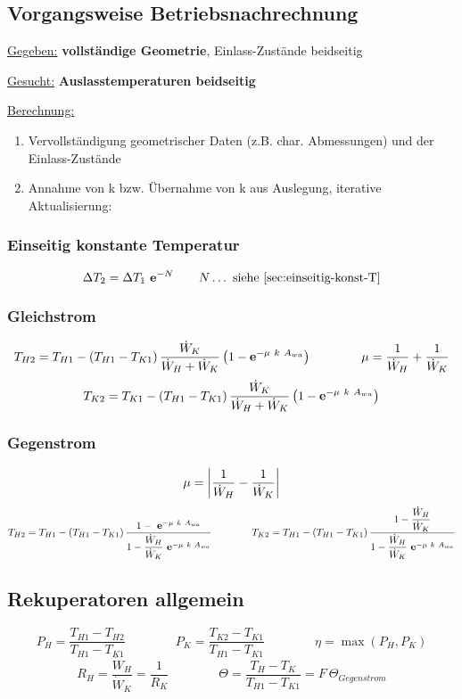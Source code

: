 \subsection{Vorgangsweise Betriebsnachrechnung}
	\underline{Gegeben:} \textbf{vollständige Geometrie}, Einlass-Zustände beidseitig

	\underline{Gesucht:} \textbf{Auslasstemperaturen beidseitig}

	\begin{singlespace}
		\underline{Berechnung: }
		\begin{enumerate}
			\item Vervollständigung geometrischer Daten (z.B. char. Abmessungen) und der Einlass-Zustände
			\item Annahme von k bzw. Übernahme von k aus Auslegung, iterative Aktualisierung:
		\end{enumerate}
	\end{singlespace}

\subsubsection{Einseitig konstante Temperatur }
	\[ \Delta T_2 = \Delta T_1\ \eul^{-N}   \qquad N\dots \text{ siehe \ref{sec:einseitig-konst-T}} \]

\subsubsection{Gleichstrom}
	\setlength{\abovedisplayshortskip}{-5pt}
	\[
		T_{H2} =  T_{H1} - (T_{H1} - T_{K1})\, \dfrac{\dot{W}_K}{\dot{W}_H + \dot{W}_K} \left(1- \eul^{-\mu\ k\ A_{wa}}\right)
		\qquad\qquad \mu = \dfrac{1}{\dot{W}_H} + \dfrac{1}{\dot{W}_K}
	\]
	\[
		T_{K2} =  T_{K1} - (T_{H1} - T_{K1})\, \dfrac{\dot{W}_K}{\dot{W}_H + \dot{W}_K} \left(1- \mathrm{\textbf{e}}^{-\mu\ k\ A_{wa}}\right)
	\]

\subsubsection{Gegenstrom}
	\[
		\mu  = \left|\dfrac{1}{\dot{W}_H} - \dfrac{1}{\dot{W}_K}\right|
	\]
	\[
		 T_{H2} =  T_{H1} - (T_{H1} - T_{K1})\, \dfrac{1-\ \eul^{-\mu\ k\ A_{wa}}}  {1- \dfrac{\dot{W}_H}{\dot{W}_K}\ \eul^{-\mu\ k\ A_{wa}}}
		 \qquad\qquad
		 T_{K2}  =  {T_{H1}} - (T_{H1} - T_{K1})\, \dfrac{1- \dfrac{\dot{W}_H}{\dot{W}_K}}  {1- \dfrac{\dot{W}_H}{\dot{W}_K}\ \eul^{-\mu\ k\ A_{wa}}}
	\]

\subsection{Rekuperatoren allgemein}
	\[
		P_H = \dfrac{T_{H1} - T_{H2}}{T_{H1} - T_{K1}}
		\qquad\qquad
		P_K = \dfrac{T_{K2} - T_{K1}}{T_{H1} - T_{K1}}
		\qquad\qquad
		\eta = \max(P_H,P_K)
	 \]
	 \[
	 	R_H = \dfrac{\dot{W}_H}{\dot{W}_K} = \dfrac{1}{R_K}
	 	\qquad\qquad
	 	\varTheta = \dfrac{T_H - T_K}{T_{H1} - T_{K1}} = F\ \varTheta_{Gegenstrom}
	 \]

